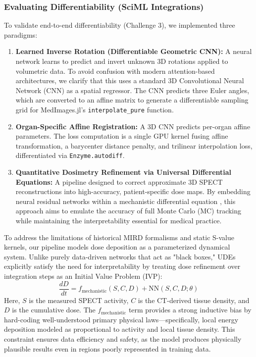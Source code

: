 \documentclass[10pt,letterpaper]{article}
\begin{document}
\subsubsection{Evaluating Differentiability (SciML Integrations)}
To validate end-to-end differentiability (Challenge 3), we implemented three paradigms:
\begin{enumerate}
    \item \textbf{Learned Inverse Rotation (Differentiable Geometric CNN):} A neural network learns to predict and invert unknown 3D rotations applied to volumetric data. To avoid confusion with modern attention-based architectures, we clarify that this uses a standard 3D Convolutional Neural Network (CNN) as a spatial regressor. The CNN predicts three Euler angles, which are converted to an affine matrix to generate a differentiable sampling grid for MedImages.jl's \texttt{interpolate\_pure} function.
    \item \textbf{Organ-Specific Affine Registration:} A 3D CNN predicts per-organ affine parameters. The loss computation is a single GPU kernel fusing affine transformation, a barycenter distance penalty, and trilinear interpolation loss, differentiated via \texttt{Enzyme.autodiff}.
    \item \textbf{Quantitative Dosimetry Refinement via Universal Differential Equations:} A pipeline designed to correct approximate 3D SPECT reconstructions into high-accuracy, patient-specific dose maps. By embedding neural residual networks within a mechanistic differential equation \cite{Berman_2024}, this approach aims to emulate the accuracy of full Monte Carlo (MC) tracking while maintaining the interpretability essential for medical practice.
\end{enumerate}

To address the limitations of historical MIRD formalisms and static S-value kernels, our pipeline models dose deposition as a parameterized dynamical system. Unlike purely data-driven networks that act as "black boxes," UDEs explicitly satisfy the need for interpretability by treating dose refinement over integration steps as an Initial Value Problem (IVP):
\begin{equation}
\frac{dD}{dt} = f_{\text{mechanistic}}(S, C, D) + \text{NN}(S, C, D; \theta)
\end{equation}
Here, $S$ is the measured SPECT activity, $C$ is the CT-derived tissue density, and $D$ is the cumulative dose. The $f_{\text{mechanistic}}$ term provides a strong inductive bias by hard-coding well-understood primary physical laws—specifically, local energy deposition modeled as proportional to activity and local tissue density. This constraint ensures data efficiency and safety, as the model produces physically plausible results even in regions poorly represented in training data.
\end{document}
